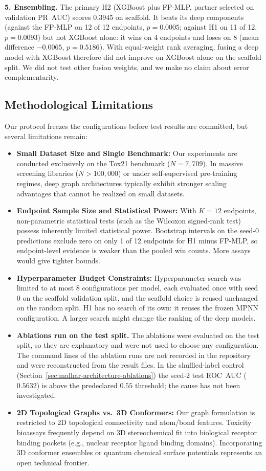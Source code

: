 \textbf{5. Ensembling.} The primary H2 (XGBoost plus FP-MLP, partner selected on validation PR~AUC) scores $0.3945$ on scaffold. It beats its deep components (against the FP-MLP on 12 of 12 endpoints, $p = 0.0005$; against H1 on 11 of 12, $p = 0.0093$) but not XGBoost alone: it wins on 4 endpoints and loses on 8 (mean difference $-0.0065$, $p = 0.5186$). With equal-weight rank averaging, fusing a deep model with XGBoost therefore did not improve on XGBoost alone on the scaffold split. We did not test other fusion weights, and we make no claim about error complementarity.

\subsection{Methodological Limitations}
Our protocol freezes the configurations before test results are committed, but several limitations remain:

\begin{itemize}
    \item \textbf{Small Dataset Size and Single Benchmark:} Our experiments are conducted exclusively on the Tox21 benchmark ($N = 7,709$). In massive screening libraries ($N > 100,000$) or under self-supervised pre-training regimes, deep graph architectures typically exhibit stronger scaling advantages that cannot be realized on small datasets.
    \item \textbf{Endpoint Sample Size and Statistical Power:} With $K = 12$ endpoints, non-parametric statistical tests (such as the Wilcoxon signed-rank test) possess inherently limited statistical power. Bootstrap intervals on the seed-0 predictions exclude zero on only 1 of 12 endpoints for H1 minus FP-MLP, so endpoint-level evidence is weaker than the pooled win counts. More assays would give tighter bounds.
    \item \textbf{Hyperparameter Budget Constraints:} Hyperparameter search was limited to at most 8 configurations per model, each evaluated once with seed 0 on the scaffold validation split, and the scaffold choice is reused unchanged on the random split. H1 has no search of its own: it reuses the frozen MPNN configuration. A larger search might change the ranking of the deep models.
    \item \textbf{Ablations run on the test split.} The ablations were evaluated on the test split, so they are explanatory and were not used to choose any configuration. The command lines of the ablation runs are not recorded in the repository and were reconstructed from the result files. In the shuffled-label control (Section~\ref{sec:malhar-architecture-ablations}) the seed-2 test ROC~AUC ($0.5632$) is above the predeclared $0.55$ threshold; the cause has not been investigated.
    \item \textbf{2D Topological Graphs vs.\ 3D Conformers:} Our graph formulation is restricted to 2D topological connectivity and atom/bond features. Toxicity bioassays frequently depend on 3D stereochemical fit into biological receptor binding pockets (e.g., nuclear receptor ligand binding domains). Incorporating 3D conformer ensembles or quantum chemical surface potentials represents an open technical frontier.
\end{itemize}
